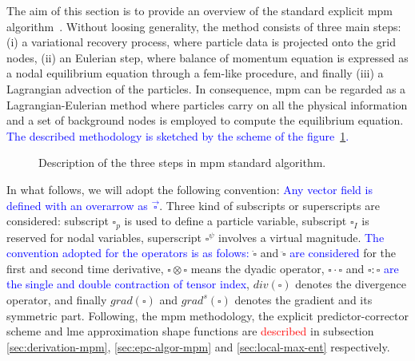 \documentclass[preprint,12pt,a4paper]{elsarticle}
\newcommand{\Div}[1]{
  \ensuremath{div({#1})}
}
\newcommand\Grad[1]{grad({#1})}
\newcommand\GradS[1]{grad^s({#1})}
\begin{document}
The aim of this section is to provide an overview of the standard
explicit \acrshort{mpm} algorithm~\cite{Sulsky1994}. Without loosing
generality, the method consists of three main steps: (i) a
variational recovery process, where particle data is projected onto the
grid nodes, (ii) an Eulerian step, where balance of momentum equation
is expressed as a nodal equilibrium equation through a \acrshort{fem}-like
procedure, and finally (iii) a Lagrangian advection of the
particles. In consequence, \acrshort{mpm} can be regarded as a
Lagrangian-Eulerian method where particles carry on all the physical
information and a set of background nodes is employed to
compute the equilibrium equation. \textcolor{blue}{The described methodology is sketched by the scheme of the figure~\ref{fig:MPM_algorithm}.}
\begin{figure}
  \centering
  \caption{Description of the three steps in \acrshort{mpm} standard algorithm.}
  \label{fig:MPM_algorithm}
\end{figure}
 In what follows, we will adopt the following convention: \textcolor{blue}{Any vector field is defined with an overarrow as $\vec{\square}$}. Three kind of subscripts or superscripts are  considered:  subscript $\square_p$ is used to define a particle variable,  subscript $\square_I$ is reserved for nodal variables, superscript $\square^{\psi}$ involves a virtual magnitude. \textcolor{blue}{The convention adopted for the operators is as folows:} $\dot{\square}$ and $\ddot{\square}$ \textcolor{blue}{are considered} for the first and second time derivative, $\square \otimes \square$ means the dyadic operator, $\square \cdot \square$ and $\square \colon \square$ \textcolor{blue}{are the single and double contraction of tensor index}, $\Div{\square}$ denotes the divergence operator, and finally $\Grad{\square}$ and $\GradS{\square}$ denotes the gradient and its symmetric part. Following, the \acrshort{mpm} methodology, the explicit predictor-corrector scheme and \acrshort{lme} approximation shape functions are \textcolor{red}{described} in subsection \ref{sec:derivation-mpm}, \ref{sec:epc-algor-mpm} and \ref{sec:local-max-ent} respectively.
\end{document}
